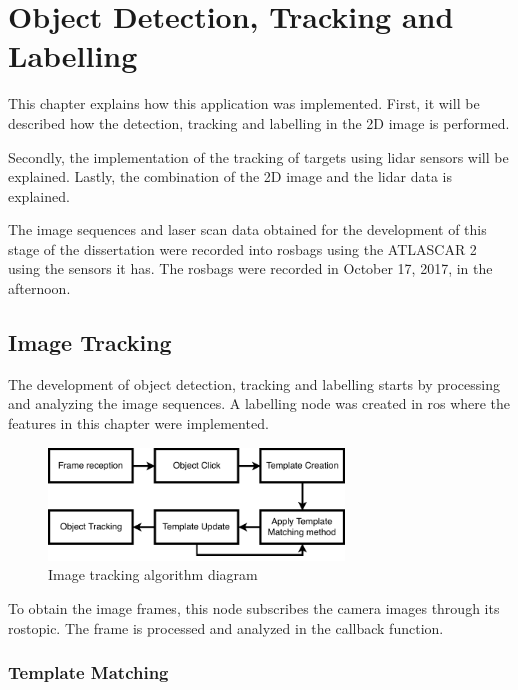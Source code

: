 \chapter{Object Detection, Tracking and Labelling}

This chapter explains how this application was implemented. First, it will be described how the detection, tracking and labelling in the 2D image is performed. 

Secondly, the implementation of the tracking of targets using \gls{lidar} sensors will be explained. Lastly, the combination of the 2D image and the \gls{lidar} data is explained.

The image sequences and laser scan data obtained for the development of this stage of the dissertation were recorded into rosbags using the ATLASCAR 2 using the sensors it has. The rosbags were recorded in October 17, 2017, in the afternoon. 

\section{Image Tracking}

The development of object detection, tracking and labelling starts by processing and analyzing the image sequences. A labelling node was created in \gls{ros} where the features in this chapter were implemented. 

\begin{figure}[htp]
	
	\centering
	\includegraphics[width=0.7\textwidth]{caplabel/imgs/templatediagram.pdf}
	
	\caption{Image tracking algorithm diagram}
	\label{fig:view}
	
\end{figure}

To obtain the image frames, this node subscribes the camera images through its rostopic. The frame is processed and analyzed in the callback function.

\subsection{Template Matching}

